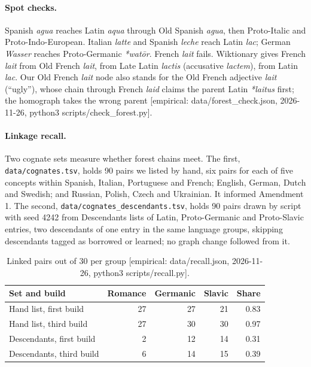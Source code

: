 \documentclass[11pt]{article}
\newcommand{\emp}[1]{{\small[empirical: #1]}}
\newcommand{\recrun}{data/recall.json, 2026-11-26, python3 scripts/recall.py}
\newcommand{\checkrun}{data/forest\_check.json, 2026-11-26, python3 scripts/check\_forest.py}
\begin{document}
\paragraph{Spot checks.} Spanish \emph{agua} reaches Latin \emph{aqua}
through Old Spanish \emph{agua}, then Proto-Italic and
Proto-Indo-European. Italian \emph{latte} and Spanish \emph{leche} reach
Latin \emph{lac}; German \emph{Wasser} reaches Proto-Germanic
\emph{*watōr}. French \emph{lait} fails. Wiktionary gives French
\emph{lait} from Old French \emph{lait}, from Late Latin \emph{lactis}
(accusative \emph{lactem}), from Latin \emph{lac}. Our Old French
\emph{lait} node also stands for the Old French adjective \emph{lait}
(``ugly''), whose chain through French \emph{laid} claims the parent
Latin \emph{*laitus} first; the homograph takes the wrong parent
\emp{\checkrun}.

\paragraph{Linkage recall.} Two cognate sets measure whether forest chains
meet. The first, \texttt{data/cognates.tsv}, holds 90 pairs we listed by
hand, six pairs for each of five concepts within Spanish, Italian,
Portuguese and French; English, German, Dutch and Swedish; and Russian,
Polish, Czech and Ukrainian. It informed Amendment 1. The second,
\texttt{data/cognates\_descendants.tsv}, holds 90 pairs drawn by script
with seed 4242 from Descendants lists of Latin, Proto-Germanic and
Proto-Slavic entries, two descendants of one entry in the same language
groups, skipping descendants tagged as borrowed or learned; no graph
change followed from it.

\begin{table}[htbp]
  \centering
  \caption{Linked pairs out of 30 per group \emp{\recrun}.}
  \label{tab:recall}
  \begin{tabular}{@{}lrrrr@{}}
    \toprule
    Set and build & Romance & Germanic & Slavic & Share \\
    \midrule
    Hand list, first build & 27 & 27 & 21 & 0.83 \\
    Hand list, third build & 27 & 30 & 30 & 0.97 \\
    Descendants, first build & 2 & 12 & 14 & 0.31 \\
    Descendants, third build & 6 & 14 & 15 & 0.39 \\
    \bottomrule
  \end{tabular}
\end{table}
\end{document}
